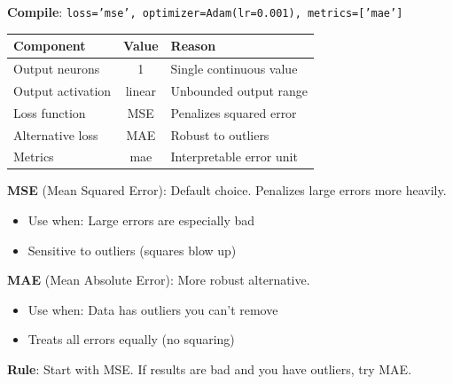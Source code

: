 \documentclass[11pt,a4paper]{article}
\begin{document}
\begin{examplebox}

\begin{center}
\end{center}
\vspace{-0.5em}
\textbf{Compile}: \texttt{loss='mse', optimizer=Adam(lr=0.001), metrics=['mae']}
\end{examplebox}

\begin{definitionbox}

\begin{tabular}{@{}l|c|l@{}}
\textbf{Component} & \textbf{Value} & \textbf{Reason} \\
\hline
Output neurons & 1 & Single continuous value \\
Output activation & linear & Unbounded output range \\
Loss function & MSE & Penalizes squared error \\
Alternative loss & MAE & Robust to outliers \\
Metrics & mae & Interpretable error unit \\
\end{tabular}
\end{definitionbox}

\begin{notebox}

\textbf{MSE} (Mean Squared Error): Default choice. Penalizes large errors more heavily.
\begin{itemize}[leftmargin=*,nosep]
\item Use when: Large errors are especially bad
\item Sensitive to outliers (squares blow up)
\end{itemize}

\textbf{MAE} (Mean Absolute Error): More robust alternative.
\begin{itemize}[leftmargin=*,nosep]
\item Use when: Data has outliers you can't remove
\item Treats all errors equally (no squaring)
\end{itemize}

\textbf{Rule}: Start with MSE. If results are bad and you have outliers, try MAE.
\end{notebox}
\end{document}
